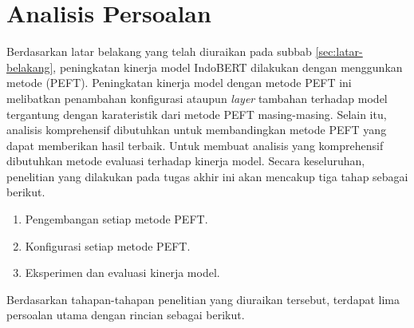 \section{Analisis Persoalan}
\label{sec:analisis-persoalan}

Berdasarkan latar belakang yang telah diuraikan pada subbab \ref{sec:latar-belakang}, peningkatan kinerja model IndoBERT dilakukan dengan menggunkan metode \PEFT (PEFT). Peningkatan kinerja model dengan metode PEFT ini melibatkan penambahan konfigurasi ataupun \textit{layer} tambahan terhadap model tergantung dengan karateristik dari metode PEFT masing-masing. Selain itu, analisis komprehensif dibutuhkan untuk membandingkan metode PEFT yang dapat memberikan hasil terbaik. Untuk membuat analisis yang komprehensif dibutuhkan metode evaluasi terhadap kinerja model. Secara keseluruhan, penelitian yang dilakukan pada tugas akhir ini akan mencakup tiga tahap sebagai berikut.

\begin{enumerate}
    \item Pengembangan setiap metode PEFT.
    \item Konfigurasi setiap metode PEFT.
    \item Eksperimen dan evaluasi kinerja model.
\end{enumerate}

Berdasarkan tahapan-tahapan penelitian yang diuraikan tersebut, terdapat lima persoalan utama dengan rincian sebagai berikut.

